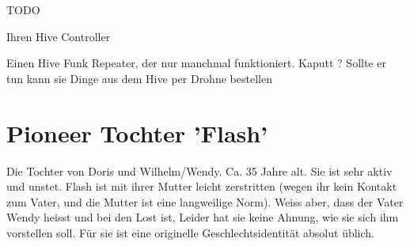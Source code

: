 \begin{npcBox}[title=Doris]
    \begin{stressSection}
    \end{stressSection}
    \begin{tabularx}{\textwidth}{ XX }
    \end{tabularx}

    \begin{consequences}
    \item {}
    \item {}
    \item {}
    \end{consequences}

    \begin{npcDescription}
    TODO
    \end{npcDescription}


    \begin{equipment}
    \item Ihren Hive Controller
    \item Einen Hive Funk Repeater, der nur manchmal funktioniert. Kaputt ? Sollte er tun kann sie Dinge aus dem Hive per Drohne bestellen
    \end{equipment}
\end{npcBox}
\newpage

\section{Pioneer Tochter 'Flash'}

Die Tochter von Doris und Wilhelm/Wendy. Ca. 35 Jahre alt. Sie ist sehr aktiv und unstet. Flash ist mit ihrer Mutter leicht zerstritten (wegen ihr kein Kontakt zum Vater, und die Mutter ist eine langweilige Norm). Weiss aber, dass der Vater Wendy heisst und bei den Lost ist, Leider hat sie keine Ahnung, wie sie sich ihm vorstellen soll. Für sie ist eine originelle Geschlechtsidentität absolut üblich.

